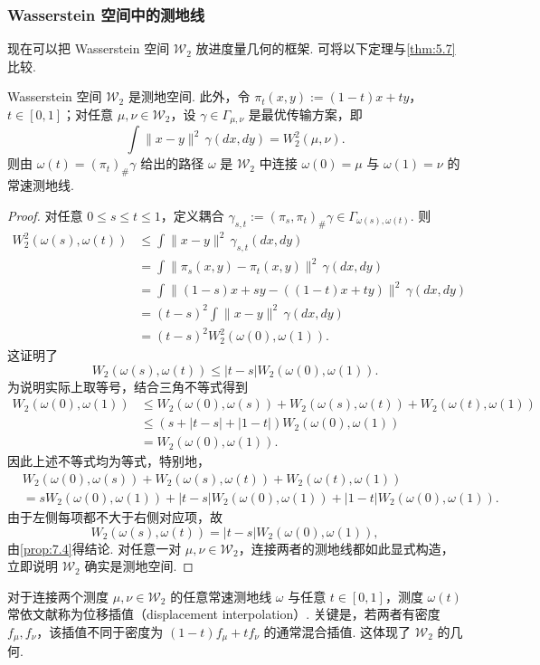 \subsubsection{Wasserstein 空间中的测地线}\label{sec:7.1.3}
现在可以把 Wasserstein 空间 $\mathcal W_2$ 放进度量几何的框架. 可将以下定理与\autoref{thm:5.7}比较.
\begin{theorem}\label{thm:7.6}
Wasserstein 空间 $\mathcal W_2$ 是测地空间. 此外，令 $\pi_t(x,y):=(1-t)x+ty$，$t\in[0,1]$；对任意 $\mu,\nu\in\mathcal W_2$，设 $\gamma\in\Gamma_{\mu,\nu}$ 是最优传输方案，即
$$\int\lVert x-y\rVert^2\,\gamma(dx,dy)=W_2^2(\mu,\nu).$$
则由 $\omega(t)=(\pi_t)_\#\gamma$ 给出的路径 $\omega$ 是 $\mathcal W_2$ 中连接 $\omega(0)=\mu$ 与 $\omega(1)=\nu$ 的常速测地线.
\end{theorem}
\begin{proof}
对任意 $0\le s\le t\le1$，定义耦合 $\gamma_{s,t}:=(\pi_s,\pi_t)_\#\gamma\in\Gamma_{\omega(s),\omega(t)}$. 则
$$\begin{aligned}
W_2^2(\omega(s),\omega(t))
&\le\int\lVert x-y\rVert^2\,\gamma_{s,t}(dx,dy)\\
&=\int\lVert\pi_s(x,y)-\pi_t(x,y)\rVert^2\,\gamma(dx,dy)\\
&=\int\lVert(1-s)x+sy-((1-t)x+ty)\rVert^2\,\gamma(dx,dy)\\
&=(t-s)^2\int\lVert x-y\rVert^2\,\gamma(dx,dy)\\
&=(t-s)^2W_2^2(\omega(0),\omega(1)).
\end{aligned}$$
这证明了
$$W_2(\omega(s),\omega(t))\le|t-s|W_2(\omega(0),\omega(1)).$$
为说明实际上取等号，结合三角不等式得到
$$\begin{aligned}
W_2(\omega(0),\omega(1))
&\le W_2(\omega(0),\omega(s))+W_2(\omega(s),\omega(t))+W_2(\omega(t),\omega(1))\\
&\le(s+|t-s|+|1-t|)W_2(\omega(0),\omega(1))\\
&=W_2(\omega(0),\omega(1)).
\end{aligned}$$
因此上述不等式均为等式，特别地，
$$\begin{aligned}
&W_2(\omega(0),\omega(s))+W_2(\omega(s),\omega(t))+W_2(\omega(t),\omega(1))\\
&=sW_2(\omega(0),\omega(1))+|t-s|W_2(\omega(0),\omega(1))+|1-t|W_2(\omega(0),\omega(1)).
\end{aligned}$$
由于左侧每项都不大于右侧对应项，故
$$W_2(\omega(s),\omega(t))=|t-s|W_2(\omega(0),\omega(1)),$$
由\autoref{prop:7.4}得结论. 对任意一对 $\mu,\nu\in\mathcal W_2$，连接两者的测地线都如此显式构造，立即说明 $\mathcal W_2$ 确实是测地空间.
\end{proof}
对于连接两个测度 $\mu,\nu\in\mathcal W_2$ 的任意常速测地线 $\omega$ 与任意 $t\in[0,1]$，测度 $\omega(t)$ 常依文献\cite{ref225}称为位移插值（displacement interpolation）. 关键是，若两者有密度 $f_\mu,f_\nu$，该插值不同于密度为 $(1-t)f_\mu+tf_\nu$ 的通常混合插值. 这体现了 $\mathcal W_2$ 的几何.

